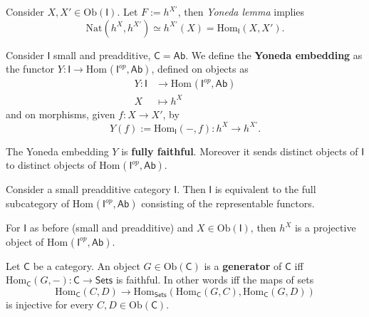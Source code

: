 \begin{rem}
	Consider $X, X' \in \mathrm{Ob} \left(\mathsf{I}\right)$. 
	Let $F := h^{X'}$, then \textit{Yoneda lemma} implies
	\begin{equation}
		\mathrm{Nat} \left( h^X, h^{X'} \right) \simeq h^{X'}(X) = \mathrm{Hom}_{\mathsf{I}} \left( X, X' \right)
	.\end{equation} 
\end{rem}

\begin{defn}
	Consider $\mathsf{I}$ small and preadditive, $\mathsf{C} = \mathsf{Ab}$.
	We define the \textbf{Yoneda embedding} as the functor
	$Y: \mathsf{I} \to \mathrm{Hom}_{\mathsf{}} \left( \mathsf{I}^{op}, \mathsf{Ab} \right)$, defined on objects as
	\begin{align}
		Y: \mathsf{I} &\to \mathrm{Hom}_{\mathsf{}} \left( \mathsf{I}^{op}, \mathsf{Ab} \right) \\
		X &\mapsto h^X
	\end{align} 
	and on morphisms, given $f: X \to X'$, by
	\begin{equation}
		Y(f):= \mathrm{Hom}_{\mathsf{I}} \left( -, f \right): h^X \to h^{X'}
	.\end{equation} 
\end{defn}

\begin{prop}
	The Yoneda embedding $Y$ is \textbf{fully faithful}.
	Moreover it sends distinct objects of $\mathsf{I}$ to distinct objects of $\mathrm{Hom}_{\mathsf{}} \left( \mathsf{I}^{op}, \mathsf{Ab} \right)$.
\end{prop} 

\begin{cor}
	Consider a small preadditive category $\mathsf{I}$.
	Then $\mathsf{I}$ is equivalent to the full subcategory of $\mathrm{Hom}_{\mathsf{}} \left( \mathsf{I}^{op}, \mathsf{Ab} \right)$ 
	consisting of the representable functors.
\end{cor} 

\begin{prop}
	For $\mathsf{I}$ as before (small and preadditive) and $X \in \mathrm{Ob} \left(\mathsf{I}\right)$, then
	$h^X$ is a projective object of $\mathrm{Hom}_{\mathsf{}} \left( \mathsf{I}^{op}, \mathsf{Ab} \right)$.
\end{prop} 

\begin{defn}
	Let $\mathsf{C}$ be a category.
	An object $G \in \mathrm{Ob} \left(\mathsf{C}\right)$ is a \textbf{generator} of $\mathsf{C}$ iff
	$\mathrm{Hom}_{\mathsf{C}} \left( G, - \right): \mathsf{C} \to \mathsf{Sets}$ is faithful.
	In other words iff the maps of sets
	 \begin{equation}
	\mathrm{Hom}_{\mathsf{C}} \left( C, D \right) \to
	\mathrm{Hom}_{\mathsf{Sets}} \left( \mathrm{Hom}_{\mathsf{C}} \left( G, C \right), 
	\mathrm{Hom}_{\mathsf{C}} \left( G, D \right) \right)
	\end{equation} 
	is injective for every $C, D \in \mathrm{Ob} \left(\mathsf{C}\right)$.
\end{defn}

